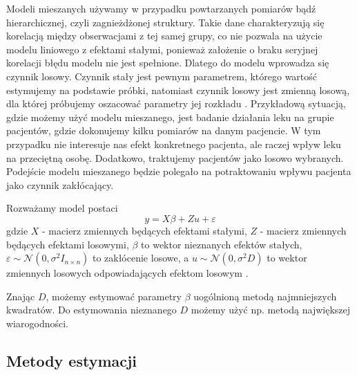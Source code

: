 \documentclass[12pt]{mwbk}
\theoremstyle{plain}
\theoremstyle{definition}
\theoremstyle{remark}
\begin{document}
Modeli mieszanych używamy w przypadku powtarzanych pomiarów bądź hierarchicznej, czyli zagnieżdżonej struktury. Takie dane charakteryzują się korelacją między obserwacjami z tej samej grupy, co nie pozwala na użycie modelu liniowego z efektami stałymi, ponieważ założenie o braku seryjnej korelacji błędu modelu nie jest spełnione. Dlatego do modelu wprowadza się czynnik losowy.  Czynnik stały jest pewnym parametrem, którego wartość estymujemy na podstawie próbki, natomiast czynnik losowy jest zmienną losową, dla której próbujemy oszacować parametry jej rozkładu \cite{faraway}.
Przykładową sytuacją, gdzie możemy użyć modelu mieszanego, jest badanie działania leku na grupie pacjentów, gdzie dokonujemy kilku pomiarów na danym pacjencie. W tym przypadku nie interesuje nas efekt konkretnego pacjenta, ale raczej wpływ leku na przeciętną osobę. Dodatkowo, traktujemy pacjentów jako losowo wybranych. Podejście modelu mieszanego będzie polegało na potraktowaniu wpływu pacjenta jako czynnik zakłócający. 


Rozważamy model postaci
$$y=X\beta +Z u + \varepsilon$$
gdzie $X$ - macierz zmiennych będących efektami stałymi, $Z$ - macierz zmiennych będących efektami losowymi, $\beta$ to wektor nieznanych efektów stałych, $\varepsilon \sim \mathcal{N}(0, \sigma^2 I_{n\times n})$ to zakłócenie losowe, a $u \sim \mathcal{N} (0, \sigma^2D)$ to wektor zmiennych losowych odpowiadających efektom losowym \cite{biecek}.

Znając $D$, możemy estymować parametry $\beta$ uogólnioną metodą najmniejszych kwadratów. Do estymowania nieznanego $D$ możemy użyć np. metodą największej wiarogodności.

\subsection{Metody estymacji}
\end{document}
